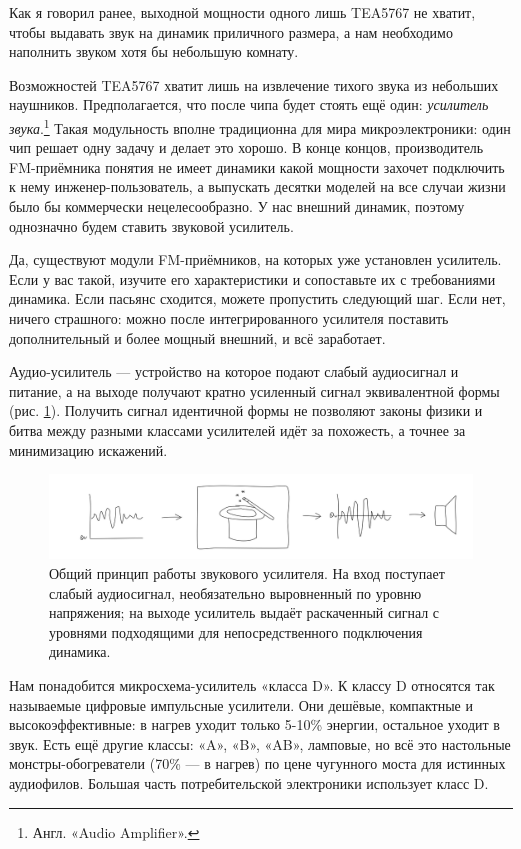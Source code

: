Как я говорил ранее, выходной мощности одного лишь TEA5767 не хватит, чтобы выдавать звук на динамик приличного размера, а нам необходимо наполнить звуком хотя бы небольшую комнату.

Возможностей TEA5767 хватит лишь на извлечение тихого звука из небольших наушников. Предполагается, что после чипа будет стоять ещё один: \emph{усилитель звука}.\footnote{Англ. «Audio Amplifier».} Такая модульность вполне традиционна для мира микроэлектроники: один чип решает одну задачу и делает это хорошо. В конце концов, производитель FM-приёмника понятия не имеет динамики какой мощности захочет подключить к нему инженер-пользователь, а выпускать десятки моделей на все случаи жизни было бы коммерчески нецелесообразно. У нас внешний динамик, поэтому однозначно будем ставить звуковой усилитель.

\begin{Note}
  Да, существуют модули FM-приёмников, на которых уже установлен усилитель. Если у вас такой, изучите его характеристики и сопоставьте их с требованиями динамика. Если пасьянс сходится, можете пропустить следующий шаг. Если нет, ничего страшного: можно после интегрированного усилителя поставить дополнительный и более мощный внешний, и всё заработает.
\end{Note}

Аудио-усилитель — устройство на которое подают слабый аудиосигнал и питание, а на выходе получают кратно усиленный сигнал эквивалентной формы (рис. \ref{fig:sound-amp-diagram}). Получить сигнал идентичной формы не позволяют законы физики и битва между разными классами усилителей идёт за похожесть, а точнее за минимизацию искажений.

\begin{figure}
  \centering
  \includegraphics{sketches/sound-amp-diagram}
  \caption{Общий принцип работы звукового усилителя. На вход поступает слабый аудиосигнал, необязательно выровненный по уровню напряжения; на выходе усилитель выдаёт раскаченный сигнал с уровнями подходящими для непосредственного подключения динамика.}
  \label{fig:sound-amp-diagram}
\end{figure}

Нам понадобится микросхема-усилитель «класса D». К классу D относятся так называемые цифровые импульсные усилители. Они дешёвые, компактные и высокоэффективные: в нагрев уходит только 5-10\% энергии, остальное уходит в звук. Есть ещё другие классы: «A», «B», «AB», ламповые, но всё это настольные монстры-обогреватели (70\% — в нагрев) по цене чугунного моста для истинных аудиофилов. Большая часть потребительской электроники использует класс D.

